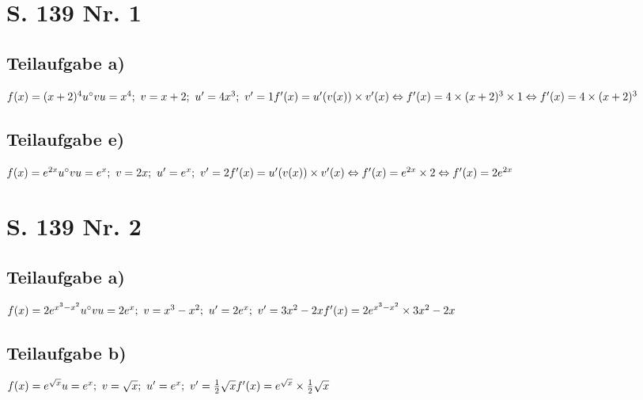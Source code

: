 \documentclass[11pt, a4paper]{report}
\begin{document}
	\chapter{S. 139 Nr. 1}
	\section{Teilaufgabe a)}
	$
	f(x) = (x + 2)^4\\
	u^\circ v\\
	u=x^4;\ v=x + 2;\ u' = 4x^3;\ v' = 1 \\
	f'(x) = u'(v(x)) \times v'(x) \\
	\Leftrightarrow f'(x) = 4 \times (x + 2)^3 \times 1 \\
	\Leftrightarrow f'(x) = 4 \times (x + 2)^3 \\
	$
	\section{Teilaufgabe e)}
	$
	f(x) = e^{2x} \\
	u^\circ v \\
	u = e^x;\ v= 2x;\ u' = e^x;\ v' = 2 \\
	f'(x) = u'(v(x)) \times v'(x) \\
	\Leftrightarrow f'(x) = e^{2x} \times 2 \\
	\Leftrightarrow f'(x) = 2e^{2x}
	$
	\chapter{S. 139 Nr. 2}
	\section{Teilaufgabe a)}
	$
	f(x) = 2e^{x^3-x^2}\\
	u^\circ v\\
	u = 2e^x;\ v= x^3-x^2;\ u' = 2e^x;\ v' = 3x^2-2x \\
	f'(x)= 2e^{x^3-x^2} \times 3x^2-2x\\
	$
	\section{Teilaufgabe b)}
	$
	f(x) = e^{\sqrt{x}} \\
	u = e^x;\ v = \sqrt{x};\ u' = e^x;\ v' = \frac{1}{2}\sqrt{x} \\
	f'(x) = e^{\sqrt{x}} \times \frac{1}{2}\sqrt{x}
	$
	
\end{document}
